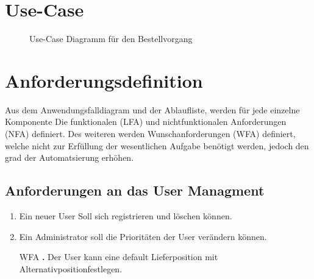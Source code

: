 \section{Use-Case}
\begin{figure}[!ht]
\caption{Use-Case Diagramm für den Bestellvorgang}
\label{fig:use-case}
\end{figure}

\section{Anforderungsdefinition}
Aus dem Anwendungsfalldiagram und der Ablaufliste, werden für jede einzelne Komponente Die funktionalen (LFA) und nichtfunktionalen Anforderungen (NFA) definiert.
Des weiteren werden Wunschanforderungen (WFA) definiert, welche nicht zur Erfüllung der wesentlichen Aufgabe benötigt werden, jedoch den grad der Automatsierung erhöhen.%

\subsection{Anforderungen an das User Managment}
\begin{enumerate}[nosep,style=sameline]
\renewcommand{\labelenumi}{ULFA \textbf{\theenumi.}}
\item Ein neuer User Soll sich registrieren und löschen können.
\item Ein Administrator soll die Prioritäten der User verändern können.
\item[WFA \textbf{\theenumi.}] Der User kann eine default Lieferposition mit Alternativpositionfestlegen.
\end{enumerate}

